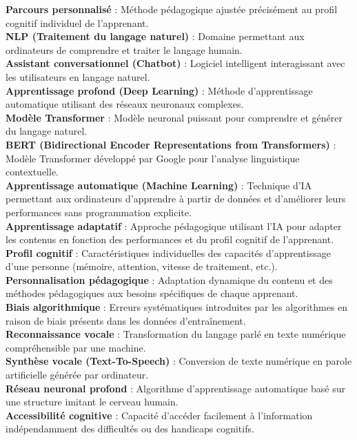 \documentclass[11pt,a4paper]{report}
\begin{document}
\textbf{Parcours personnalisé} : Méthode pédagogique ajustée précisément au profil cognitif individuel de l'apprenant.\\
\textbf{NLP (Traitement du langage naturel)} : Domaine permettant aux ordinateurs de comprendre et traiter le langage humain.\\
\textbf{Assistant conversationnel (Chatbot)} : Logiciel intelligent interagissant avec les utilisateurs en langage naturel.\\
\textbf{Apprentissage profond (Deep Learning)} : Méthode d’apprentissage automatique utilisant des réseaux neuronaux complexes.\\
\textbf{Modèle Transformer} : Modèle neuronal puissant pour comprendre et générer du langage naturel.\\
\textbf{BERT (Bidirectional Encoder Representations from Transformers)} : Modèle Transformer développé par Google pour l'analyse linguistique contextuelle.\\
\textbf{Apprentissage automatique (Machine Learning)} : Technique d’IA permettant aux ordinateurs d’apprendre à partir de données et d’améliorer leurs performances sans programmation explicite.\\
\textbf{Apprentissage adaptatif} : Approche pédagogique utilisant l’IA pour adapter les contenus en fonction des performances et du profil cognitif de l’apprenant.\\
\textbf{Profil cognitif} : Caractéristiques individuelles des capacités d’apprentissage d’une personne (mémoire, attention, vitesse de traitement, etc.).\\
\textbf{Personnalisation pédagogique} : Adaptation dynamique du contenu et des méthodes pédagogiques aux besoins spécifiques de chaque apprenant.\\
\textbf{Biais algorithmique} : Erreurs systématiques introduites par les algorithmes en raison de biais présents dans les données d’entraînement.\\
\textbf{Reconnaissance vocale} : Transformation du langage parlé en texte numérique compréhensible par une machine.\\
\textbf{Synthèse vocale (Text-To-Speech)} : Conversion de texte numérique en parole artificielle générée par ordinateur.\\
\textbf{Réseau neuronal profond} : Algorithme d’apprentissage automatique basé sur une structure imitant le cerveau humain.\\
\textbf{Accessibilité cognitive} : Capacité d'accéder facilement à l’information indépendamment des difficultés ou des handicaps cognitifs.\\
\end{document}
